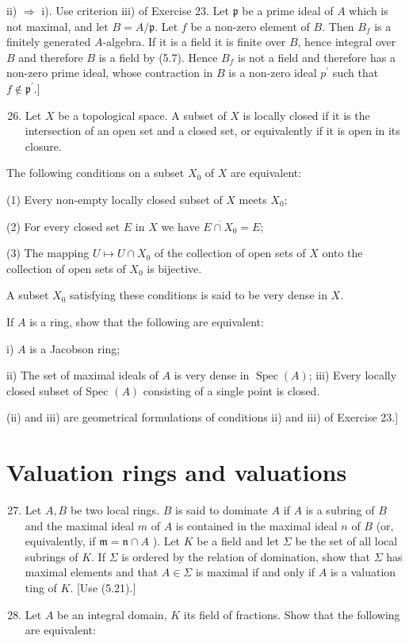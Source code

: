 \documentclass{standalone}
\theoremstyle{definition}
\theoremstyle{remark}
\begin{document}
ii) $\Rightarrow$ i). Use criterion iii) of Exercise 23. Let $\mathfrak{p}$ be a prime ideal of $A$ which is not maximal, and let $B=A / \mathfrak{p}$. Let $f$ be a non-zero element of $B$. Then $B_{f}$ is a finitely generated $A$-algebra. If it is a field it is finite over $B$, hence integral over $B$ and therefore $B$ is a field by (5.7). Hence $B_{f}$ is not a field and therefore has a non-zero prime ideal, whose contraction in $B$ is a non-zero ideal $p^{\prime}$ such that $f \notin \mathfrak{p}^{\prime}$.]

\begin{enumerate}
  \setcounter{enumi}{25}
  \item Let $X$ be a topological space. A subset of $X$ is locally closed if it is the intersection of an open set and a closed set, or equivalently if it is open in its closure.
\end{enumerate}

The following conditions on a subset $X_{0}$ of $X$ are equivalent:

(1) Every non-empty locally closed subset of $X$ meets $X_{0}$;

(2) For every closed set $E$ in $X$ we have ${\overline{E \cap X_{0}}}=E$;

(3) The mapping $U \mapsto U \cap X_{0}$ of the collection of open sets of $X$ onto the collection of open sets of $X_{0}$ is bijective.

A subset $X_{0}$ satisfying these conditions is said to be very dense in $X$.

If $A$ is a ring, show that the following are equivalent:

i) $A$ is a Jacobson ring;

ii) The set of maximal ideals of $A$ is very dense in $\operatorname{Spec}(A)$; iii) Every locally closed subset of Spec $(A)$ consisting of a single point is closed.

(ii) and iii) are geometrical formulations of conditions ii) and iii) of Exercise 23.]

\section{Valuation rings and valuations}
\begin{enumerate}
  \setcounter{enumi}{26}
  \item Let $A, B$ be two local rings. $B$ is said to dominate $A$ if $A$ is a subring of $B$ and the maximal ideal $m$ of $A$ is contained in the maximal ideal $n$ of $B$ (or, equivalently, if $\mathfrak{m}=\mathfrak{n} \cap A$ ). Let $K$ be a field and let $\Sigma$ be the set of all local subrings of $K$. If $\Sigma$ is ordered by the relation of domination, show that $\Sigma$ has maximal elements and that $A \in \Sigma$ is maximal if and only if $A$ is a valuation ting of $K$. [Use (5.21).]

  \item Let $A$ be an integral domain, $K$ its field of fractions. Show that the following are equivalent:

\end{enumerate}
\end{document}

